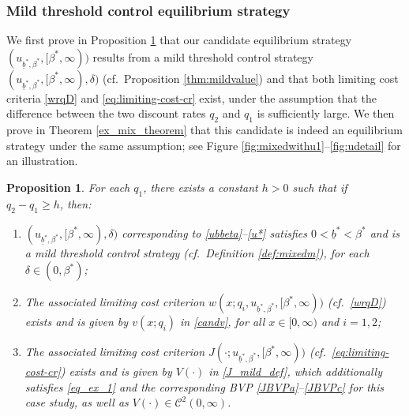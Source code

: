 \documentclass[11pt]{article} %
\newtheorem{proposition}[theorem]{Proposition}
\def\ub{\underline{b}}
\numberwithin{komcounter}{section}
\begin{document}
\subsubsection{Mild threshold control equilibrium strategy}
\label{sec:Equiu}

We first prove in Proposition \ref{2141gsd} that our candidate equilibrium strategy $(u_{\ub^*,\beta^*},[\beta^*,\infty))$ results from a mild threshold control strategy $(u_{\ub^*,\beta^*},[\beta^*,\infty), \delta)$ (cf.~Proposition \ref{thm:mildvalue}) and that both limiting cost criteria \eqref{wrqD} and \eqref{eq:limiting-cost-cr} exist, under the assumption that the difference between the two discount rates $q_2$ and $q_1$ is sufficiently large.
We then prove in Theorem \ref{ex_mix_theorem} that this candidate is indeed an equilibrium strategy under the same assumption; see Figure \ref{fig:mixedwithu1}--\ref{fig:udetail} for an illustration. 


\begin{proposition}\label{2141gsd} For each $q_1$, there exists a constant $h>0$ such that if $q_2-q_1\geq h$, then:
\begin{enumerate}[\rm (i)]
\vspace{-2mm}
\item $(u_{\ub^*,\beta^*},[\beta^*,\infty), \delta)$  corresponding to \eqref{ubbeta}--\eqref{u*} satisfies $0 < \ub^* < \beta^*$ and is a  mild threshold control strategy (cf.~Definition \ref{def:mixedm}), for each $\delta \in (0, \beta^*)$; 
    
\vspace{-2mm}
\item The associated limiting cost criterion $w(x;q_i,u_{\ub^*,\beta^*},[\beta^*,\infty))$ (cf.~\eqref{wrqD}) exists and is given by $v(x;q_i)$ in \eqref{candv}, for all $x \in [0,\infty)$ and $i=1,2$;
    
\vspace{-2mm}
\item The associated limiting cost criterion $J(\cdot;u_{\ub^*,\beta^*},[\beta^*,\infty))$ (cf.~\eqref{eq:limiting-cost-cr}) exists and is given by $V(\cdot)$ in \eqref{J_mild_def}, which additionally satisfies \eqref{eq_ex_1} and the corresponding BVP \eqref{JBVPa}--\eqref{JBVPc} for this case study, as well as $V(\cdot) \in \mathcal{C}^2(0,\infty)$.
\end{enumerate}
\end{proposition}
\end{document}
